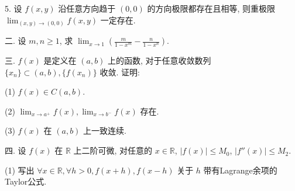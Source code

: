 \documentclass{examcollection}
\begin{document}
{\begin{minipage}{\textwidth}
5. 设 $f(x, y)$ 沿任意方向趋于 $(0, 0)$ 的方向极限都存在且相等, 则重极限 $\lim_{(x, y) \to (0, 0)} f(x, y)$ 一定存在.\par
二. 设 $m, n \geq 1$, 求 $\lim_{x \to 1} \left( \frac{m}{1 - x^m} - \frac{n}{1 - x^n} \right)$.\par
三. $f(x)$ 是定义在 $(a, b)$ 上的函数, 对于任意收敛数列 $\{x_{n}\} \subset (a, b), \{f(x_{n})\}$ 收敛. 证明:\par
(1) $f(x)\in C(a,b).$\par
(2) $\lim_{x\to a^{+}}f(x),\lim_{x\to b^{-}}f(x)$ 存在.\par
(3) $f(x)$ 在 $(a, b)$ 上一致连续.\par
四. 设 $f(x)$ 在 $\mathbb{R}$ 上二阶可微, 对任意的 $x \in \mathbb{R}$, $|f(x)| \leq M_0$, $|f''(x)| \leq M_2$.\par
(1) 写出 $\forall x \in \mathbb{R}, \forall h > 0, f(x + h), f(x - h)$ 关于 $h$ 带有Lagrange余项的Taylor公式.\par
\end{minipage}}
\ifdim\dimexpr\ht\proofbox+\dp\proofbox\relax>\textheight
\noindent\resizebox{!}{\textheight}{\usebox{\proofbox}}\else\noindent\usebox{\proofbox}\fi\clearpage
\end{document}
